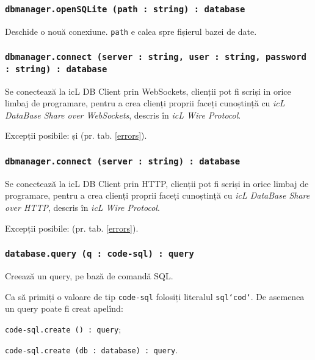 \subsubsection{\texttt{dbmanager.openSQLite (path : string) : database}}

Deschide o nouă conexiune. \texttt{path} e calea spre fișierul bazei de date.

\subsubsection{\texttt{dbmanager.connect (server : string, user : string, password : string) : database}}

Se conectează la icL DB Client prin WebSockets, clienții pot fi scriși in orice limbaj de programare, pentru a crea clienți proprii faceți cunoștință cu \textit{icL DataBase Share over WebSockets}, descris în \textit{icL Wire Protocol}.

Excepții posibile:  și  (pr. tab. \ref{errors}).

\subsubsection{\texttt{dbmanager.connect (server : string) : database}}

Se conectează la icL DB Client prin HTTP, clienții pot fi scriși in orice limbaj de programare, pentru a crea clienți proprii faceți cunoștință cu \textit{icL DataBase Share over HTTP}, descris în \textit{icL Wire Protocol}.

Excepții posibile:  (pr. tab. \ref{errors}).

\subsubsection{\texttt{database.query (q : code-sql) : query}}

Creează un query, pe bază de comandă SQL.

Ca să primiți o valoare de tip \texttt{code-sql} folosiți literalul \texttt{sql{`cod`}}. De asemenea un query poate fi creat apelînd:
\begin{icItems}
\item \texttt{code-sql.create () : query};
\item \texttt{code-sql.create (db : database) : query}.
\end{icItems}

